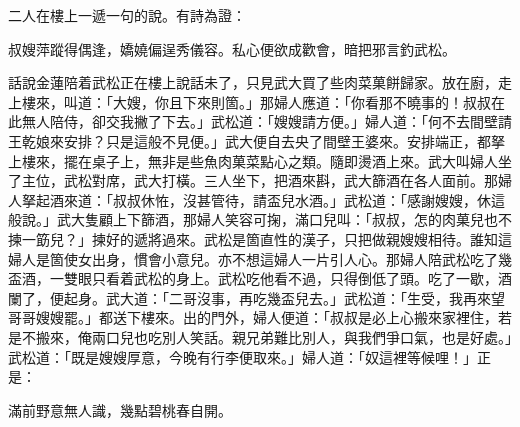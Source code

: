 二人在樓上一遞一句的說。有詩為證：

叔嫂萍蹤得偶逢，嬌嬈偏逞秀儀容。私心便欲成歡會，暗把邪言釣武松。

話說金蓮陪着武松正在樓上說話未了，只見武大買了些肉菜菓餅歸家。放在廚，走上樓來，叫道：「大嫂，你且下來則箇。」那婦人應道：「你看那不曉事的！叔叔在此無人陪侍，卻交我撇了下去。」{}武松道：「嫂嫂請方便。」婦人道：「何不去間壁請王乾娘來安排？{}只是這般不見便。」武大便自去央了間壁王婆來。安排端正，都拏上樓來，擺在桌子上，無非是些魚肉菓菜點心之類。隨即燙酒上來。武大叫婦人坐了主位，武松對席，武大打橫。三人坐下，把酒來斟，武大篩酒在各人面前。那婦人拏起酒來道：「叔叔休恠，沒甚管待，請盃兒水酒。」武松道：「感謝嫂嫂，休這般說。」武大隻顧上下篩酒，那婦人笑容可掬，滿口兒叫：「叔叔，怎的肉菓兒也不揀一筯兒？」{}揀好的遞將過來。武松是箇直性的漢子，只把做親嫂嫂相待。誰知這婦人是箇使女出身，慣會小意兒。亦不想這婦人一片引人心。那婦人陪武松吃了幾盃酒，一雙眼只看着武松的身上。武松吃他看不過，只得倒低了頭。{}吃了一歇，酒闌了，便起身。武大道：「二哥沒事，再吃幾盃兒去。」武松道：「生受，我再來望哥哥嫂嫂罷。」都送下樓來。出的門外，婦人便道：「叔叔是必上心搬來家裡住，若是不搬來，俺兩口兒也吃別人笑話。親兄弟難比別人，與我們爭口氣，也是好處。」{}武松道：「既是嫂嫂厚意，今晚有行李便取來。」婦人道：「奴這裡等候哩！」正是：

滿前野意無人識，幾點碧桃春自開。

